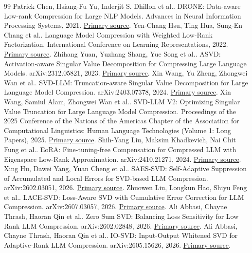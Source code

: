 \documentclass[conference]{IEEEtran}
\begin{document}
\begin{thebibliography}{99}
 Patrick Chen, Hsiang-Fu Yu, Inderjit S. Dhillon et al.. DRONE: Data-aware Low-rank Compression for Large NLP Models. Advances in Neural Information Processing Systems, 2021. \href{https://proceedings.neurips.cc/paper/2021/hash/f56de5ef149cf0aedcc8f4797031e229-Abstract.html}{Primary source}.
 Yen-Chang Hsu, Ting Hua, Sung-En Chang et al.. Language Model Compression with Weighted Low-Rank Factorization. International Conference on Learning Representations, 2022. \href{https://openreview.net/pdf?id=uPv9Y3gmAI5}{Primary source}.
 Zhihang Yuan, Yuzhang Shang, Yue Song et al.. ASVD: Activation-aware Singular Value Decomposition for Compressing Large Language Models. arXiv:2312.05821, 2023. \href{https://arxiv.org/abs/2312.05821}{Primary source}.
 Xin Wang, Yu Zheng, Zhongwei Wan et al.. SVD-LLM: Truncation-aware Singular Value Decomposition for Large Language Model Compression. arXiv:2403.07378, 2024. \href{https://arxiv.org/abs/2403.07378}{Primary source}.
 Xin Wang, Samiul Alam, Zhongwei Wan et al.. SVD-LLM V2: Optimizing Singular Value Truncation for Large Language Model Compression. Proceedings of the 2025 Conference of the Nations of the Americas Chapter of the Association for Computational Linguistics: Human Language Technologies (Volume 1: Long Papers), 2025. \href{https://aclanthology.org/2025.naacl-long.217/}{Primary source}.
 Shih-Yang Liu, Maksim Khadkevich, Nai Chit Fung et al.. EoRA: Fine-tuning-free Compensation for Compressed LLM with Eigenspace Low-Rank Approximation. arXiv:2410.21271, 2024. \href{https://arxiv.org/abs/2410.21271}{Primary source}.
 Xing Hu, Dawei Yang, Yuan Cheng et al.. SAES-SVD: Self-Adaptive Suppression of Accumulated and Local Errors for SVD-based LLM Compression. arXiv:2602.03051, 2026. \href{https://arxiv.org/abs/2602.03051}{Primary source}.
 Zhuowen Liu, Longkun Hao, Shiyu Feng et al.. LACE-SVD: Loss-Aware SVD with Cumulative Error Correction for LLM Compression. arXiv:2607.03057, 2026. \href{https://arxiv.org/abs/2607.03057}{Primary source}.
 Ali Abbasi, Chayne Thrash, Haoran Qin et al.. Zero Sum SVD: Balancing Loss Sensitivity for Low Rank LLM Compression. arXiv:2602.02848, 2026. \href{https://arxiv.org/abs/2602.02848}{Primary source}.
 Ali Abbasi, Chayne Thrash, Haoran Qin et al.. IO-SVD: Input-Output Whitened SVD for Adaptive-Rank LLM Compression. arXiv:2605.15626, 2026. \href{https://arxiv.org/abs/2605.15626}{Primary source}.

\end{thebibliography}
\end{document}
